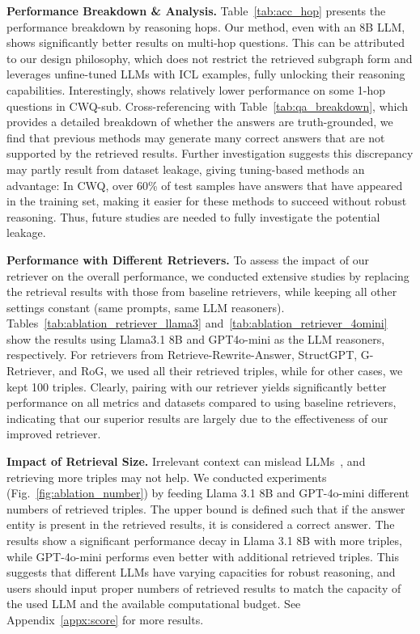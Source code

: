 \textbf{Performance Breakdown \& Analysis.}
Table~\ref{tab:acc_hop} presents the performance breakdown by reasoning hops. 
Our method, even with an 8B LLM, shows significantly better results on multi-hop questions. This can be attributed to our design philosophy, which does not restrict the retrieved subgraph form and leverages unfine-tuned LLMs with ICL examples, fully unlocking their reasoning capabilities.
Interestingly, \proj shows relatively lower performance on some 1-hop questions in CWQ-sub. Cross-referencing with Table~\ref{tab:qa_breakdown}, which provides a detailed breakdown of whether the answers are truth-grounded, we find that previous methods may generate many correct answers that are not supported by the retrieved results.
Further investigation suggests this discrepancy may partly result from dataset leakage, giving tuning-based methods an advantage: In CWQ, over 60\% of test samples have answers that have appeared in the training set, making it easier for these methods to succeed without robust reasoning. Thus, future studies are needed to fully investigate the potential leakage.

\textbf{Performance with Different Retrievers.} 
To assess the impact of our retriever on the overall performance, we conducted extensive studies by replacing the retrieval results with those from baseline retrievers, while keeping all other settings constant (same prompts, same LLM reasoners).
Tables~\ref{tab:ablation_retriever_llama3} and~\ref{tab:ablation_retriever_4omini} show the results using Llama3.1 8B and GPT4o-mini as the LLM reasoners, respectively. For retrievers from Retrieve-Rewrite-Answer, StructGPT, G-Retriever, and RoG, we used all their retrieved triples, while for other cases, we kept 100 triples.
Clearly, pairing with our retriever yields significantly better performance on all metrics and datasets compared to using baseline retrievers, indicating that our superior results are largely due to the effectiveness of our improved retriever.

\label{para: reasoner_vary_k}
\textbf{Impact of Retrieval Size.} 
Irrelevant context can mislead LLMs~\citep{wu2024easily}, and retrieving more triples may not help. We conducted experiments (Fig.~\ref{fig:ablation_number}) by feeding Llama 3.1 8B and GPT-4o-mini different numbers of retrieved triples. The upper bound is defined such that if the answer entity is present in the retrieved results, it is considered a correct answer. The results show a significant performance decay in Llama 3.1 8B with more triples, while GPT-4o-mini performs even better with additional retrieved triples. This suggests that different LLMs have varying capacities for robust reasoning, and users should input proper numbers of retrieved results to match the capacity of the used LLM and the available computational budget. See Appendix~\ref{appx:score} for more results.

